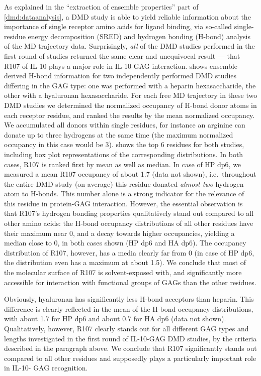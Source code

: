 As explained in the \enquote{extraction of ensemble properties} part of
\cref{dmd:dataanalysis}, a DMD study is able to yield reliable information
about the importance of single receptor amino acids for ligand binding, via
so-called single-residue energy decomposition (SRED) and hydrogen bonding
(H-bond) analysis of the MD trajectory data. Surprisingly, \textit{all} of the
DMD studies performed in the first round of studies returned the same clear and
unequivocal result --- that R107 of IL-10 plays a major role in IL-10-GAG
interaction.  shows ensemble-derived
H-bond information for two independently performed DMD studies differing in the
GAG type: one was performed with a heparin hexasaccharide, the other with a
hyaluronan hexasaccharide. For each free MD trajectory in these two DMD studies
we determined the normalized occupancy of H-bond donor atoms in each receptor
residue, and ranked the results by the mean normalized occupancy. We accumulated
all donors within single residues, for instance an arginine can donate up to
three hydrogens at the same time (the maximum normalized occupancy in this case
would be 3).  shows the top 6
residues for both studies, including box plot representations of the
corresponding distributions. In both cases, R107 is ranked first by mean as well
as median. In case of HP dp6, we measured a mean R107 occupancy of about 1.7
(data not shown), i.e.\ throughout the entire DMD study (on average) this
residue donated \textit{almost two} hydrogen atom to H-bonds. This number alone
is a strong indicator for the relevance of this residue in protein-GAG
interaction. However, the essential observation is that R107's hydrogen bonding
properties qualitatively stand out compared to all other amino acids: the H-bond
occupancy distributions of all other residues have their maximum near 0, and a
decay towards higher occupancies, yielding a median close to 0, in both cases
shown (HP dp6 and HA dp6). The occupancy distribution of R107, however, has a
media clearly far from 0 (in case of HP dp6, the distribution even has a maximum
at about 1.5). We conclude that most of the molecular surface of R107 is
solvent-exposed with, and significantly more accessible for interaction with
functional groups of GAGs than the other residues.

Obviously, hyaluronan has significantly less H-bond acceptors than heparin. This
difference is clearly reflected in the mean of the H-bond occupancy
distributions, with about 1.7 for HP dp6 and about 0.7 for HA dp6 (data not
shown). Qualitatively, however, R107 clearly stands out for all different GAG
types and lengths investigated in the first round of IL-10-GAG DMD studies, by
the criteria described in the paragraph above. We conclude that R107
significantly stands out compared to all other residues and supposedly plays a
particularly important role in IL-10- GAG recognition.


